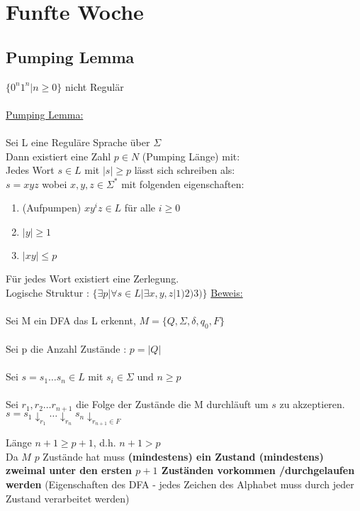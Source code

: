 \documentclass[18pt,a4paper]{scrreprt}
\begin{document}
\chapter{Funfte Woche}
\section{Pumping Lemma}


$\{0^n 1^n | n \ge 0\}$ nicht Regulär\\\\
\uline{Pumping Lemma:}\\
\\
Sei L eine Reguläre Sprache über $\Sigma$\\
Dann existiert eine Zahl $p \in N$ (Pumping Länge) mit:\\
Jedes Wort $s \in L$ mit $|s| \ge p$ lässt sich schreiben als:\\
$s = x y z$ wobei $x,y,z \in \Sigma^*$ mit folgenden eigenschaften:\\
\begin{enumerate}
 \item (Aufpumpen) $x y^i z \in L$ für alle $ i \ge 0$
 \item $|y| \ge 1$
 \item $|xy| \le p$
\end{enumerate}

Für jedes Wort existiert eine Zerlegung.\\
Logische Struktur : $\{\exists p | \forall s \in L | \exists x,y,z | 1)2)3)\}$
\newpage
\uline{Beweis:}\\
\\
Sei M ein DFA das L erkennt, $M = \{Q,\Sigma,\delta,q_0,F\}$\\
\\
Sei p die Anzahl Zustände : $p = |Q|$\\
\\
Sei $ s = s_1 \hdots s_n \in L$ mit $ s_i \in \Sigma $ und $ n \ge p$\\
\\
Sei $r_1,r_2 \hdots r_{n+1}$ die Folge der Zustände die M durchläuft um $s$ zu akzeptieren.\\
$ s = s_1 \downarrow_{r_1} \hdots \downarrow_{r_n}  s_n \downarrow_{r_{n+1} \in F}$

Länge $n+1 \ge p+1$, d.h. $n+1 > p$\\

Da $M$ $p$ Zustände hat muss \textbf{(mindestens) ein Zustand (mindestens) zweimal unter den ersten $p+1$ Zuständen vorkommen /durchgelaufen werden} (Eigenschaften des DFA - jedes Zeichen des Alphabet muss durch jeder Zustand verarbeitet werden)\\
\end{document}
